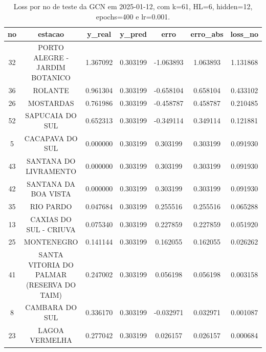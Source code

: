 \begin{table}[h]
\centering
\caption{Loss por no de teste da GCN em 2025-01-12, com k=61, HL=6, hidden=12, epochs=400 e lr=0.001.}
\label{tab:gcn_loss_k61_hl6_h12_e400_d20250112}
\begin{tabular}{ccccccc}
\toprule
no & estacao & y\_real & y\_pred & erro & erro\_abs & loss\_no \\
\midrule
32 & PORTO ALEGRE - JARDIM BOTANICO & 1.367092 & 0.303199 & -1.063893 & 1.063893 & 1.131868 \\
36 & ROLANTE & 0.961304 & 0.303199 & -0.658104 & 0.658104 & 0.433102 \\
26 & MOSTARDAS & 0.761986 & 0.303199 & -0.458787 & 0.458787 & 0.210485 \\
52 & SAPUCAIA DO SUL & 0.652313 & 0.303199 & -0.349114 & 0.349114 & 0.121881 \\
5 & CACAPAVA DO SUL & 0.000000 & 0.303199 & 0.303199 & 0.303199 & 0.091930 \\
43 & SANTANA DO LIVRAMENTO & 0.000000 & 0.303199 & 0.303199 & 0.303199 & 0.091930 \\
42 & SANTANA DA BOA VISTA & 0.000000 & 0.303199 & 0.303199 & 0.303199 & 0.091930 \\
35 & RIO PARDO & 0.047684 & 0.303199 & 0.255516 & 0.255516 & 0.065288 \\
13 & CAXIAS DO SUL - CRIUVA & 0.075340 & 0.303199 & 0.227859 & 0.227859 & 0.051920 \\
25 & MONTENEGRO & 0.141144 & 0.303199 & 0.162055 & 0.162055 & 0.026262 \\
41 & SANTA VITORIA DO PALMAR (RESERVA DO TAIM) & 0.247002 & 0.303199 & 0.056198 & 0.056198 & 0.003158 \\
8 & CAMBARA DO SUL & 0.336170 & 0.303199 & -0.032971 & 0.032971 & 0.001087 \\
23 & LAGOA VERMELHA & 0.277042 & 0.303199 & 0.026157 & 0.026157 & 0.000684 \\
\bottomrule
\end{tabular}
\end{table}
